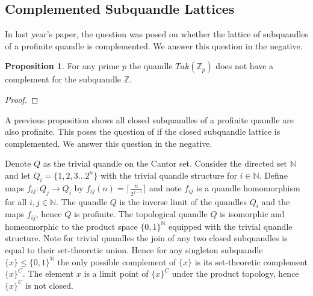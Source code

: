\documentclass[reqno,dvipsnames]{amsart}
\theoremstyle{definition}
\newtheorem{proposition}[theorem]{Proposition}
\begin{document}
{

\subsection{Complemented Subquandle Lattices}

In last year's paper, the question was posed on whether the lattice of subquandles of a profinite quandle is complemented.  We answer this question in the negative.
\begin{proposition}
    For any prime $p$ the quandle $Tak(\mathbb{Z}_p)$ does not have a complement for the subquandle $\mathbb{Z}$.
\end{proposition}
\begin{proof}
\end{proof}

A previous proposition shows all closed subquandles of a profinite quandle are also profinite.  This poses the question of if the closed subquandle lattice is complemented.  We answer this question in the negative.

Denote $Q$ as the trivial quandle on the Cantor set. Consider the directed set $\mathbb{N}$ and let $Q_i=\{1,2,3...2^n\}$ with the trivial quandle structure for $i \in \mathbb{N}$. Define maps $f_{ij}:Q_j\rightarrow Q_i$ by $f_{ij}(n) = \lceil \frac{n}{2^{j-i}} \rceil$ and note $f_{ij}$ is a quandle homomorphism for all $i,j \in \mathbb{N}$.  The quandle $Q$ is the inverse limit of the quandles $Q_i$ and the maps $f_{ij}$, hence $Q$ is profinite. The topological quandle $Q$ is isomorphic and homeomorphic to the product space $\{0,1\}^\mathbb{N}$ equipped with the trivial quandle structure. Note for trivial quandles the join of any two closed subquandles is equal to their set-theoretic union. Hence for any singleton subquandle $\{x\} \leq \{0,1\}^\mathbb{N}$ the only possible complement of $\{x\}$ is its set-theoretic complement $\{x\}^C$. The element $x$ is a limit point of $\{x\}^C$ under the product topology, hence $\{x\}^C$ is not closed. 

}
\end{document}

